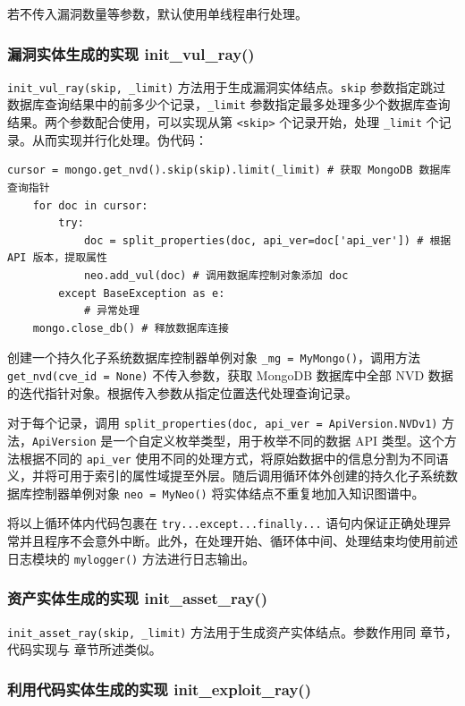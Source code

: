 \documentclass[a4paper,AutoFakeBold,oneside,12pt]{book}
\begin{document}
若不传入漏洞数量等参数，默认使用单线程串行处理。

\subsubsection{漏洞实体生成的实现 init{\_}vul{\_}ray()\label{subsubsec:vul}}

\lstinline|init_vul_ray(skip, _limit)| 方法用于生成漏洞实体结点。\lstinline|skip| 参数指定跳过数据库查询结果中的前多少个记录，\lstinline|_limit| 参数指定最多处理多少个数据库查询结果。两个参数配合使用，可以实现从第 \lstinline|<skip>| 个记录开始，处理 \lstinline|_limit| 个记录。从而实现并行化处理。伪代码：
\begin{lstlisting}[style=lgeneral]
	cursor = mongo.get_nvd().skip(skip).limit(_limit) # 获取 MongoDB 数据库查询指针
	for doc in cursor:
		try:
			doc = split_properties(doc, api_ver=doc['api_ver']) # 根据 API 版本，提取属性
			neo.add_vul(doc) # 调用数据库控制对象添加 doc
		except BaseException as e:
			# 异常处理
	mongo.close_db() # 释放数据库连接
\end{lstlisting}

创建一个持久化子系统数据库控制器单例对象 \lstinline|_mg = MyMongo()|，调用方法 \lstinline|get_nvd(cve_id = None)| 不传入参数，获取 MongoDB 数据库中全部 NVD 数据的迭代指针对象。根据传入参数从指定位置迭代处理查询记录。

对于每个记录，调用 \lstinline|split_properties(doc, api_ver = ApiVersion.NVDv1)| 方法，\lstinline|ApiVersion| 是一个自定义枚举类型，用于枚举不同的数据 API 类型。这个方法根据不同的 \lstinline|api_ver| 使用不同的处理方式，将原始数据中的信息分割为不同语义，并将可用于索引的属性域提至外层。随后调用循环体外创建的持久化子系统数据库控制器单例对象 \lstinline|neo = MyNeo()| 将实体结点不重复地加入知识图谱中。

将以上循环体内代码包裹在 \lstinline|try...except...finally...| 语句内保证正确处理异常并且程序不会意外中断。此外，在处理开始、循环体中间、处理结束均使用前述日志模块的 \lstinline|mylogger()| 方法进行日志输出。

\subsubsection{资产实体生成的实现 init{\_}asset{\_}ray()}

\lstinline|init_asset_ray(skip, _limit)| 方法用于生成资产实体结点。参数作用同  章节，代码实现与  章节所述类似。

\subsubsection{利用代码实体生成的实现 init{\_}exploit{\_}ray()}
\end{document}
